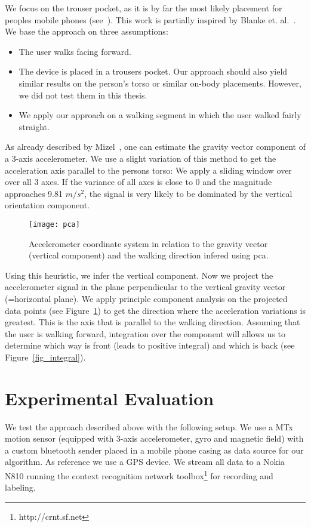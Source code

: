 We focus on the trouser pocket, as it is by far the most likely
placement for peoples mobile phones (see~\cite{Ichikawa:2005p6295}).
This work is partially inspired by Blanke
et. al.~\cite{Blanke:2008p6128}. We base the approach on three
assumptions:
\begin{itemize}
\item The user walks facing forward.
\item The device is placed in a trousers pocket. Our approach should
 also yield similar results on the person's torso or similar on-body
 placements. However, we did not test them in this thesis.
\item We apply our approach on a walking segment in which 
the user walked fairly straight.
\end{itemize}
As already described by Mizel~\cite{Mizell:2005p3885}, one can
estimate the gravity vector component of a 3-axis accelerometer. We
use a slight variation of this method to get the acceleration axis
parallel to the persons torso: We apply a sliding window over over all
3 axes. If the variance of all axes is close to 0 and the magnitude
approaches 9.81 $m/s^2$, the signal is very likely to be dominated by
the vertical orientation component.
\begin{figure}[!t]
\centering
\texttt{[image: pca]}
\caption[Accelerometer coordinate system]{Accelerometer coordinate system in relation
to the gravity vector (vertical component) and the walking
direction infered using pca.}
\label{fig_pca}
\end{figure}

Using this heuristic, we infer the vertical component.
Now we project the accelerometer signal in the plane
perpendicular to the vertical gravity vector (=horizontal plane). 
We apply principle component analysis on the projected
data points (see Figure~\ref{fig_pca}) to get the direction where the
acceleration variations is greatest.  This is the axis that is
parallel to the walking direction. Assuming that the user is walking
forward, integration over the component will allows us to determine
which way is front (leads to positive integral) and which is back
(see Figure~\ref{fig_integral}). 


\section{Experimental Evaluation}

We test the approach described above with the following setup.
We use a MTx motion sensor (equipped with 3-axis accelerometer, gyro
and magnetic field) with a custom bluetooth sender placed in a mobile
phone casing as data source for our algorithm. As reference we use a
GPS device. We stream all data to a Nokia N810 running the context
recognition network toolbox\footnote{http://crnt.sf.net} for recording
and labeling.

